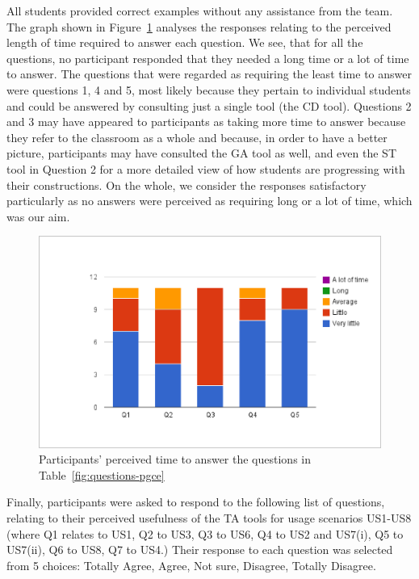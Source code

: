 All students provided correct examples without any assistance from the
team. The graph shown in Figure~\ref{fig:perceived-time} analyses the
responses relating to the perceived length of time required to
 answer each question. We see, that for all
the questions, no participant responded that they needed a long time
or a lot of time to answer. The questions that were regarded as
requiring the least time to answer were questions 1, 4 and 5, most
likely because they pertain to individual students and could be
answered by consulting just a single tool (the CD tool). Questions 2
and 3 may have appeared to participants as taking more time to answer
because they refer to the classroom as a whole and because, in order
to have a better picture, participants may have consulted the GA tool
as well, and even the ST tool in Question 2 for a more detailed view
of how students are progressing with their constructions. On the
whole, we consider the responses satisfactory particularly as no
answers were perceived as requiring long or a lot of time, which was
our aim. 

\begin{figure}[htbp]
  \centering
    \includegraphics[width=\textwidth]{gfx/perceived-time-Q1-Q5.eps}
  \caption{Participants' perceived time to answer the questions in
Table~\ref{fig:questions-pgce}} 
\label{fig:perceived-time}
\end{figure}


Finally, participants were asked to respond to the following list of
questions, relating to their perceived usefulness of the TA tools for
usage scenarios US1-US8 (where Q1 relates to US1, Q2 to US3, Q3 to
US6, Q4 to US2 and US7(i), Q5 to US7(ii), Q6 to US8, Q7 to US4.) Their
response to each question was selected from 5 choices: Totally Agree,
Agree, Not sure, Disagree, Totally Disagree.

